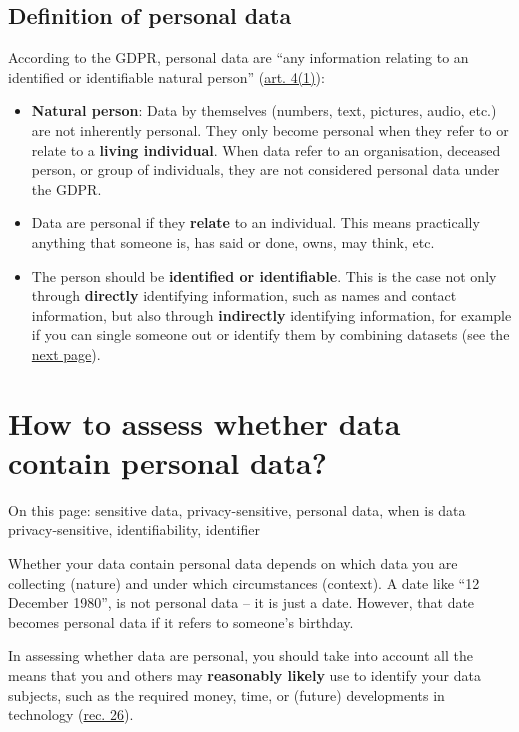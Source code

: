 \documentclass[
]{book}
\providecommand{\tightlist}{%
  \setlength{\itemsep}{0pt}\setlength{\parskip}{0pt}}
\begin{document}
\hypertarget{definition-personal-data}{%
\subsection{Definition of personal data}\label{definition-personal-data}}

According to the GDPR, personal data are ``any information relating to an
identified or identifiable natural person''
(\href{https://gdpr-info.eu/art-4-gdpr/}{art. 4(1)}):

\begin{itemize}
\tightlist
\item
  \textbf{Natural person}: Data by themselves (numbers, text, pictures, audio, etc.)
  are not inherently personal. They only become personal when they refer to or
  relate to a \textbf{living individual}. When data refer to an organisation,
  deceased person, or group of individuals, they are not considered personal data
  under the GDPR.
\item
  Data are personal if they \textbf{relate} to an individual. This means practically
  anything that someone is, has said or done, owns, may think, etc.
\item
  The person should be \textbf{identified or identifiable}. This is the case not
  only through \textbf{directly} identifying information, such as names and contact
  information, but also through \textbf{indirectly} identifying information, for
  example if you can single someone out or identify them by combining datasets
  (see the \protect\hyperlink{personal-data-assess}{next page}).
\end{itemize}

\hypertarget{personal-data-assess}{%
\section{How to assess whether data contain personal data?}\label{personal-data-assess}}

On this page: sensitive data, privacy-sensitive, personal data, when is data
privacy-sensitive, identifiability, identifier

Whether your data contain personal data depends on which data you are
collecting (nature) and under which circumstances (context). A date like
``12 December 1980'', is not personal data -- it is just a date. However, that
date becomes personal data if it refers to someone's birthday.

In assessing whether data are personal, you should take into account all the
means that you and others may \textbf{reasonably likely} use to identify your data
subjects, such as the required money, time, or (future) developments in
technology (\href{https://gdpr-info.eu/recitals/no-26/}{rec. 26}).
\end{document}
